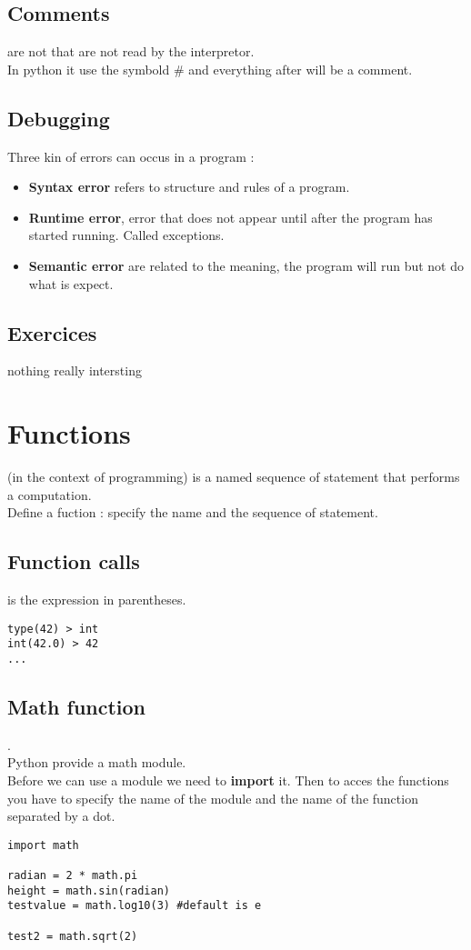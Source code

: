 \documentclass{report}
\begin{document}
\section{Comments}
 are not that are not read by the interpretor.\\
In python it use the symbold \# and everything after will be a comment.

\section{Debugging}
Three kin of errors can occus in a program : 
\begin{itemize}
    \item \textbf{Syntax error} refers to structure and rules of a program.
    \item \textbf{Runtime error}, error that does not appear until after the program has
    started running. Called exceptions.
    \item \textbf{Semantic error} are related to the meaning, the program will 
    run but not do what is expect.
\end{itemize}
\section{Exercices}
nothing really intersting

\chapter{Functions}
 (in the context of programming) is 
a named sequence of statement that performs a computation.\\
Define a fuction : specify the name and the sequence of statement.

\section{Function calls}
 is the expression in parentheses.
\begin{verbatim}
type(42) > int
int(42.0) > 42
...
\end{verbatim}
\section{Math function}
.\\
Python provide a math module.\\
Before we can use a module we need to \textbf{import} it. Then
to acces the functions you have to specify the name of the module
and the name of the function separated by a dot.
\begin{verbatim}
import math

radian = 2 * math.pi
height = math.sin(radian)
testvalue = math.log10(3) #default is e

test2 = math.sqrt(2)
\end{verbatim}
\end{document}
